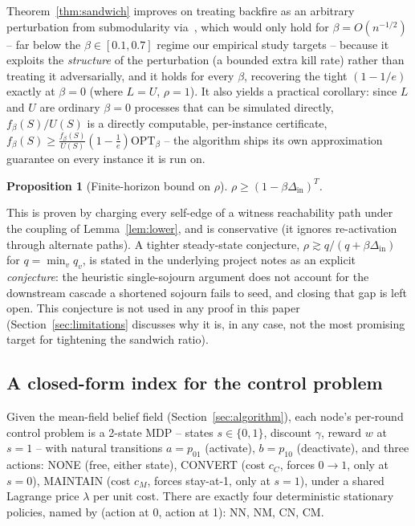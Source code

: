 \documentclass[journal]{IEEEtran}
\newtheorem{proposition}{Proposition}
\begin{document}
Theorem~\ref{thm:sandwich} improves on treating backfire as an arbitrary
perturbation from submodularity via~\cite{horel2016maximization}, which
would only hold for $\beta=O(n^{-1/2})$ -- far below the
$\beta\in[0.1,0.7]$ regime our empirical study targets -- because it
exploits the \emph{structure} of the perturbation (a bounded extra kill
rate) rather than treating it adversarially, and it holds for every
$\beta$, recovering the tight $(1-1/e)$ exactly at $\beta=0$ (where $L=U$,
$\rho=1$). It also yields a practical corollary: since $L$ and $U$ are
ordinary $\beta=0$ processes that can be simulated directly, $f_\beta(S)/U(S)$
is a directly computable, per-instance certificate,
$f_\beta(S)\ge \frac{f_\beta(S)}{U(S)}(1-\frac1e)\mathrm{OPT}_\beta$ -- the
algorithm ships its own approximation guarantee on every instance it is run
on.

\begin{proposition}[Finite-horizon bound on $\rho$]
\label{prop:rho-bound}
$\rho \ge (1-\beta\Delta_{\mathrm{in}})^T$.
\end{proposition}
This is proven by charging every self-edge of a witness reachability path
under the coupling of Lemma~\ref{lem:lower}, and is conservative (it ignores
re-activation through alternate paths). A tighter steady-state conjecture,
$\rho \gtrsim q/(q+\beta\Delta_{\mathrm{in}})$ for $q=\min_v q_v$, is stated
in the underlying project notes as an explicit \emph{conjecture}: the
heuristic single-sojourn argument does not account for the downstream
cascade a shortened sojourn fails to seed, and closing that gap is left
open. This conjecture is not used in any proof in this paper (Section~\ref{sec:limitations}
discusses why it is, in any case, not the most promising target for
tightening the sandwich ratio).

\subsection{A closed-form index for the control problem}
\label{sec:index}

Given the mean-field belief field (Section~\ref{sec:algorithm}), each
node's per-round control problem is a 2-state MDP -- states
$s\in\{0,1\}$, discount $\gamma$, reward $w$ at $s=1$ -- with natural
transitions $a=p_{01}$ (activate), $b=p_{10}$ (deactivate), and three
actions: NONE (free, either state), CONVERT (cost $c_C$, forces $0\to1$,
only at $s=0$), MAINTAIN (cost $c_M$, forces stay-at-1, only at $s=1$),
under a shared Lagrange price $\lambda$ per unit cost. There are exactly
four deterministic stationary policies, named by (action at 0, action at
1): NN, NM, CN, CM.
\end{document}
